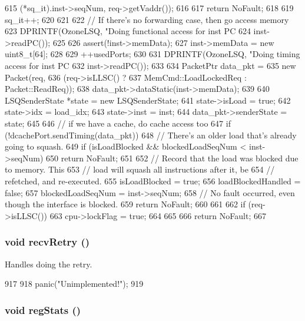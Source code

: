 \begin{DoxyCode}
{{{615                     (*sq_it).inst->seqNum, req->getVaddr());
616 
617             return NoFault;
618         }
619         sq_it++;
620     }
621 
622     // If there's no forwarding case, then go access memory
623     DPRINTF(OzoneLSQ, "Doing functional access for inst PC %
624             inst->readPC());
625 
626     assert(!inst->memData);
627     inst->memData = new uint8_t[64];
628 
629     ++usedPorts;
630 
631     DPRINTF(OzoneLSQ, "Doing timing access for inst PC %
632             inst->readPC());
633 
634     PacketPtr data_pkt =
635         new Packet(req,
636                    (req->isLLSC() ?
637                     MemCmd::LoadLockedReq : Packet::ReadReq));
638     data_pkt->dataStatic(inst->memData);
639 
640     LSQSenderState *state = new LSQSenderState;
641     state->isLoad = true;
642     state->idx = load_idx;
643     state->inst = inst;
644     data_pkt->senderState = state;
645 
646     // if we have a cache, do cache access too
647     if (!dcachePort.sendTiming(data_pkt)) {
648         // There's an older load that's already going to squash.
649         if (isLoadBlocked && blockedLoadSeqNum < inst->seqNum)
650             return NoFault;
651 
652         // Record that the load was blocked due to memory.  This
653         // load will squash all instructions after it, be
654         // refetched, and re-executed.
655         isLoadBlocked = true;
656         loadBlockedHandled = false;
657         blockedLoadSeqNum = inst->seqNum;
658         // No fault occurred, even though the interface is blocked.
659         return NoFault;
660     }
661 
662     if (req->isLLSC()) {
663         cpu->lockFlag = true;
664     }
665 
666     return NoFault;
667 }
\end{DoxyCode}
\hypertarget{classOzoneLWLSQ_a29cb5a4f98063ce6e9210eacbdb35298}{
\subsubsection[{recvRetry}]{\setlength{\rightskip}{0pt plus 5cm}void recvRetry ()}}
\label{classOzoneLWLSQ_a29cb5a4f98063ce6e9210eacbdb35298}
Handles doing the retry. 


\begin{DoxyCode}
917 {
918     panic("Unimplemented!");
919 }
\end{DoxyCode}
\hypertarget{classOzoneLWLSQ_a4dc637449366fcdfc4e764cdf12d9b11}{
\subsubsection[{regStats}]{\setlength{\rightskip}{0pt plus 5cm}void regStats ()}}
\label{classOzoneLWLSQ_a4dc637449366fcdfc4e764cdf12d9b11}



